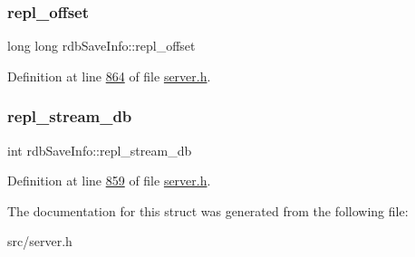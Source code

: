 \subsubsection{\texorpdfstring{repl\+\_\+offset}{repl\_offset}}
{\footnotesize\ttfamily long long rdb\+Save\+Info\+::repl\+\_\+offset}



Definition at line \hyperlink{server_8h_source_l00864}{864} of file \hyperlink{server_8h_source}{server.\+h}.

\mbox{\label{structrdbSaveInfo_abd96ba0427f13985ca7db8df8212c41a}} 
\subsubsection{\texorpdfstring{repl\+\_\+stream\+\_\+db}{repl\_stream\_db}}
{\footnotesize\ttfamily int rdb\+Save\+Info\+::repl\+\_\+stream\+\_\+db}



Definition at line \hyperlink{server_8h_source_l00859}{859} of file \hyperlink{server_8h_source}{server.\+h}.



The documentation for this struct was generated from the following file\+:\begin{DoxyCompactItemize}
\item 
src/server.\+h\end{DoxyCompactItemize}
